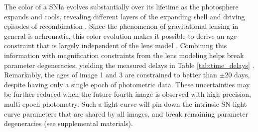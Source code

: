 \documentclass[12pt,dvipsnames]{article}
\def\SNABC{AT 2016{\textcolor{Gray}{tbd}}\xspace}
\begin{document}




The color of a SNIa evolves substantially over its lifetime as the photosphere expands and cools, revealing different layers of the expanding shell and driving episodes of recombination \cite{woosley_type_2007,kasen_type_2009}. Since the phenomenon of gravitational lensing in general is achromatic, this color evolution makes it possible to derive an age constraint that is largely independent of the lens model \cite{materials_methods_2020}.  Combining this information with magnification constraints from the lens modeling helps break parameter degeneracies, yielding the measured delays in Table \ref{tab:time_delays} \cite{materials_methods_2020}. 
Remarkably, the ages of image 1 and 3 are constrained to better than $\pm$20 days, despite having only a single epoch of photometric data.    These uncertainties may be 
further reduced when the future fourth image is observed with high-precision, multi-epoch photometry.  Such a light curve will pin down the intrinsic SN light curve parameters that are shared by all images, and break remaining parameter degeneracies (see supplemental materials).
\end{document}
